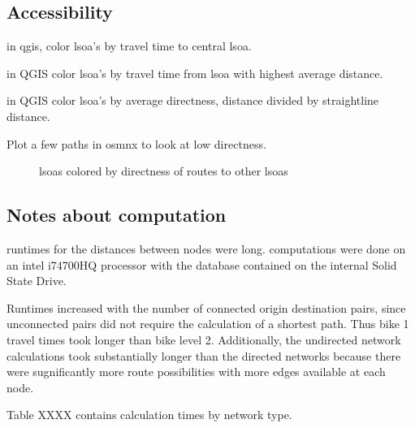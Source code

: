 \subsection{Accessibility}

in qgis, color lsoa's by travel time to central lsoa. 

in QGIS color lsoa's by travel time from lsoa with highest average distance. 

in QGIS color lsoa's by  average directness, distance divided by straightline distance. 

Plot a few paths in osmnx to look at low directness. 


\begin{figure}
\centering
\caption{lsoas colored by directness of routes to other lsoas}
\label{fig:lsoa_directness}
\end{figure}



\subsection{Notes about computation}

runtimes for the distances between nodes were long. computations were done on an intel i74700HQ processor with the database contained on the internal Solid State Drive. 

Runtimes increased with the number of connected origin destination pairs, since unconnected pairs  did not require the calculation of a shortest path. Thus bike 1 travel times took longer than bike level 2. Additionally, the undirected network calculations took substantially longer than the directed networks because there were sugnificantly more route possibilities with more edges available at each node. 

Table XXXX contains calculation times by network type. 



